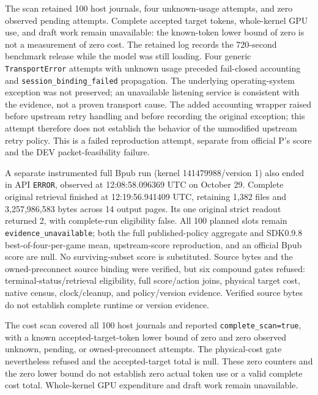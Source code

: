 \documentclass[11pt]{article}
\begin{document}
The scan retained 100 host journals, four unknown-usage attempts, and zero observed pending attempts. Complete accepted target tokens, whole-kernel GPU use, and draft work remain unavailable: the known-token lower bound of zero is not a measurement of zero cost. The retained log records the 720-second benchmark release while the model was still loading. Four generic \texttt{TransportError} attempts with unknown usage preceded fail-closed accounting and \texttt{session\_binding\_failed} propagation. The underlying operating-system exception was not preserved; an unavailable listening service is consistent with the evidence, not a proven transport cause. The added accounting wrapper raised before upstream retry handling and before recording the original exception; this attempt therefore does not establish the behavior of the unmodified upstream retry policy. This is a failed reproduction attempt, separate from official P's score and the DEV packet-feasibility failure.

A separate instrumented full Bpub run (kernel 141479988/version 1) also ended in API \texttt{ERROR}, observed at 12:08:58.096369 UTC on October 29. Complete original retrieval finished at 12:19:56.941409 UTC, retaining 1,382 files and 3,257,986,583 bytes across 14 output pages. Its one original strict readout returned 2, with complete-run eligibility false. All 100 planned slots remain \texttt{evidence\_unavailable}; both the full published-policy aggregate and SDK0.9.8 best-of-four-per-game mean, upstream-score reproduction, and an official Bpub score are null. No surviving-subset score is substituted. Source bytes and the owned-preconnect source binding were verified, but six compound gates refused: terminal-status/retrieval eligibility, full score/action joins, physical target cost, native census, clock/cleanup, and policy/version evidence. Verified source bytes do not establish complete runtime or version evidence.

The cost scan covered all 100 host journals and reported \texttt{complete\_scan=true}, with a known accepted-target-token lower bound of zero and zero observed unknown, pending, or owned-preconnect attempts. The physical-cost gate nevertheless refused and the accepted-target total is null. These zero counters and the zero lower bound do not establish zero actual token use or a valid complete cost total. Whole-kernel GPU expenditure and draft work remain unavailable.
\end{document}
